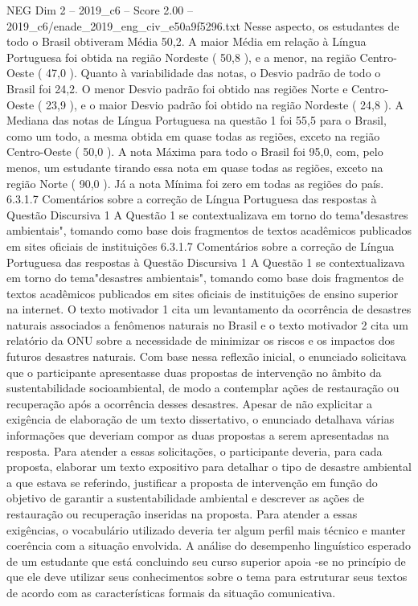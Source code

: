 \begin{textsample}{NEG Dim 2 – 2019\_c6 – Score 2.00 – 2019\_c6/enade\_2019\_eng\_civ\_e50a9f5296.txt}
Nesse aspecto, os estudantes de todo o Brasil obtiveram Média 50,2.
A maior Média em relação à Língua Portuguesa foi obtida na região Nordeste ( 50,8 ), e a menor, na região Centro-Oeste ( 47,0 ).
Quanto à variabilidade das notas, o Desvio padrão de todo o Brasil foi 24,2.
O menor Desvio padrão foi obtido nas regiões Norte e Centro-Oeste ( 23,9 ), e o maior Desvio padrão foi obtido na região Nordeste ( 24,8 ).
A Mediana das notas de Língua Portuguesa na questão 1 foi 55,5 para o Brasil, como um todo, a mesma obtida em quase todas as regiões, exceto na região Centro-Oeste ( 50,0 ).
A nota Máxima para todo o Brasil foi 95,0, com, pelo menos, um estudante tirando essa nota em quase todas as regiões, exceto na região Norte ( 90,0 ).
Já a nota Mínima foi zero em todas as regiões do país. 6.3.1.7 Comentários sobre a correção de Língua Portuguesa das respostas à Questão Discursiva 1 A Questão 1 se contextualizava em torno do tema"desastres ambientais", tomando como base dois fragmentos de textos acadêmicos publicados em sites oficiais de instituições 6.3.1.7 Comentários sobre a correção de Língua Portuguesa das respostas à Questão Discursiva 1 A Questão 1 se contextualizava em torno do tema"desastres ambientais", tomando como base dois fragmentos de textos acadêmicos publicados em sites oficiais de instituições de ensino superior na internet.
O texto motivador 1 cita um levantamento da ocorrência de desastres naturais associados a fenômenos naturais no Brasil e o texto motivador 2 cita um relatório da ONU sobre a necessidade de minimizar os riscos e os impactos dos futuros desastres naturais.
Com base nessa reflexão inicial, o enunciado solicitava que o participante apresentasse duas propostas de intervenção no âmbito da sustentabilidade socioambiental, de modo a contemplar ações de restauração ou recuperação após a ocorrência desses desastres.
Apesar de não explicitar a exigência de elaboração de um texto dissertativo, o enunciado detalhava várias informações que deveriam compor as duas propostas a serem apresentadas na resposta.
Para atender a essas solicitações, o participante deveria, para cada proposta, elaborar um texto expositivo para detalhar o tipo de desastre ambiental a que estava se referindo, justificar a proposta de intervenção em função do objetivo de garantir a sustentabilidade ambiental e descrever as ações de restauração ou recuperação inseridas na proposta.
Para atender a essas exigências, o vocabulário utilizado deveria ter algum perfil mais técnico e manter coerência com a situação envolvida.
A análise do desempenho linguístico esperado de um estudante que está concluindo seu curso superior apoia -se no princípio de que ele deve utilizar seus conhecimentos sobre o tema para estruturar seus textos de acordo com as características formais da situação comunicativa.

\end{textsample}
